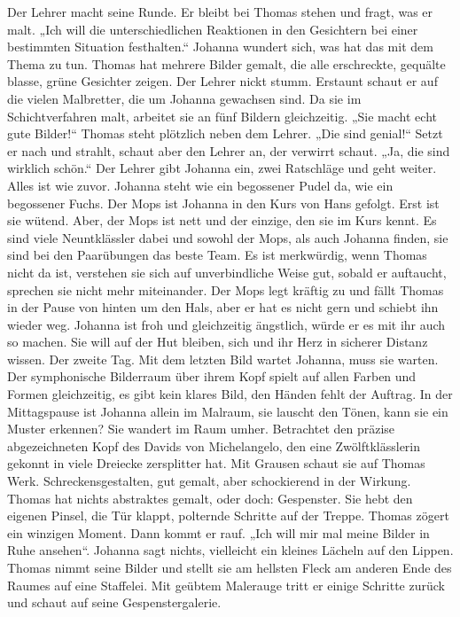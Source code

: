 Der Lehrer macht seine Runde. Er bleibt bei Thomas stehen und fragt, was er malt. „Ich will die unterschiedlichen Reaktionen in den Gesichtern bei einer bestimmten Situation festhalten.“ Johanna wundert sich, was hat das mit dem Thema zu tun. Thomas hat mehrere Bilder gemalt, die alle erschreckte, gequälte blasse, grüne Gesichter zeigen. Der Lehrer nickt stumm. 
Erstaunt schaut er auf die vielen Malbretter, die um Johanna gewachsen sind. Da sie im Schichtverfahren malt, arbeitet sie an fünf Bildern gleichzeitig. „Sie macht echt gute Bilder!“ Thomas steht plötzlich neben dem Lehrer. „Die sind genial!“ Setzt er nach und strahlt, schaut aber den Lehrer an, der verwirrt schaut. „Ja, die sind wirklich schön.“ Der Lehrer gibt Johanna ein, zwei Ratschläge und geht weiter. Alles ist wie zuvor. Johanna steht wie ein begossener Pudel da, wie ein begossener Fuchs.
Der Mops ist Johanna in den Kurs von Hans gefolgt. Erst ist sie wütend.  Aber, der Mops ist nett und der einzige, den sie im Kurs kennt. Es sind viele Neuntklässler dabei und sowohl der Mops, als auch Johanna finden, sie sind bei den Paarübungen das beste Team. Es ist merkwürdig, wenn Thomas nicht da ist, verstehen sie sich auf unverbindliche Weise gut, sobald er auftaucht, sprechen sie nicht mehr miteinander. Der Mops legt kräftig zu und fällt Thomas in der Pause von hinten um den Hals, aber er hat es nicht gern und schiebt ihn wieder weg. Johanna ist froh und gleichzeitig ängstlich, würde er es mit ihr auch so machen. Sie will auf der Hut bleiben, sich und ihr Herz in sicherer Distanz wissen.
Der zweite Tag. Mit dem letzten Bild wartet Johanna, muss sie warten. Der symphonische Bilderraum über ihrem Kopf spielt auf allen Farben und Formen gleichzeitig, es gibt kein klares Bild, den Händen fehlt der Auftrag. In der Mittagspause ist Johanna allein im Malraum, sie lauscht den Tönen, kann sie ein Muster erkennen? Sie wandert im Raum umher. Betrachtet den präzise abgezeichneten Kopf des Davids von Michelangelo, den eine Zwölftklässlerin gekonnt in viele Dreiecke zersplitter hat. Mit Grausen schaut sie auf Thomas Werk. Schreckensgestalten, gut gemalt, aber schockierend in der Wirkung. Thomas hat nichts abstraktes gemalt, oder doch: Gespenster.
Sie hebt den eigenen Pinsel, die Tür klappt, polternde Schritte auf der Treppe. Thomas zögert ein winzigen Moment. Dann kommt er rauf. „Ich will mir mal meine Bilder in Ruhe ansehen“. Johanna sagt nichts, vielleicht ein kleines Lächeln auf den Lippen. Thomas nimmt seine Bilder und stellt sie am hellsten Fleck am anderen Ende des Raumes auf eine Staffelei. Mit geübtem Malerauge tritt er einige Schritte zurück und  schaut auf seine Gespenstergalerie.
